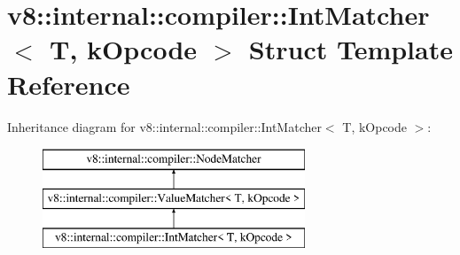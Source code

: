 \hypertarget{structv8_1_1internal_1_1compiler_1_1_int_matcher}{}\section{v8\+:\+:internal\+:\+:compiler\+:\+:Int\+Matcher$<$ T, k\+Opcode $>$ Struct Template Reference}
\label{structv8_1_1internal_1_1compiler_1_1_int_matcher}
Inheritance diagram for v8\+:\+:internal\+:\+:compiler\+:\+:Int\+Matcher$<$ T, k\+Opcode $>$\+:\begin{figure}[H]
\begin{center}
\leavevmode
\includegraphics[height=3.000000cm]{structv8_1_1internal_1_1compiler_1_1_int_matcher}
\end{center}
\end{figure}
